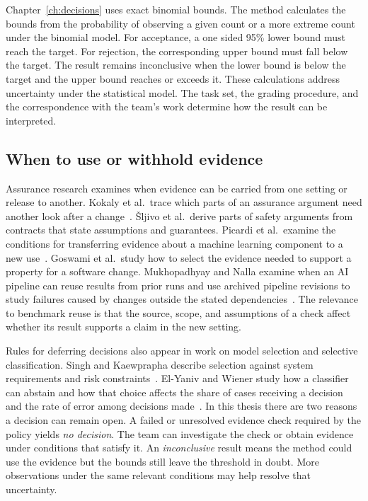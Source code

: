Chapter~\ref{ch:decisions} uses exact binomial bounds. The method calculates the bounds from the probability of observing a given count or a more extreme count under the binomial model. For acceptance, a one sided 95\% lower bound must reach the target. For rejection, the corresponding upper bound must fall below the target. The result remains inconclusive when the lower bound is below the target and the upper bound reaches or exceeds it. These calculations address uncertainty under the statistical model. The task set, the grading procedure, and the correspondence with the team's work determine how the result can be interpreted.

\subsection{When to use or withhold evidence}

Assurance research examines when evidence can be carried from one setting or release to another. Kokaly et al.\ trace which parts of an assurance argument need another look after a change~\cite{lawford_safety_case_impact_2017}. \v{S}ljivo et al.\ derive parts of safety arguments from contracts that state assumptions and guarantees. Picardi et al.\ examine the conditions for transferring evidence about a machine learning component to a new use~\cite{sljivo_assurance_contracts_2014,picardi_transfer_assurance_2023}. Goswami et al.\ study how to select the evidence needed to support a property for a software change. Mukhopadhyay and Nalla examine when an AI pipeline can reuse results from prior runs and use archived pipeline revisions to study failures caused by changes outside the stated dependencies~\cite{goswami_assurance_envelopes_2026,mukhopadhyay_nalla_evidence_reuse_2026}. The relevance to benchmark reuse is that the source, scope, and assumptions of a check affect whether its result supports a claim in the new setting.

Rules for deferring decisions also appear in work on model selection and selective classification. Singh and Kaewprapha describe selection against system requirements and risk constraints~\cite{singh_damsa_sms_2026}. El-Yaniv and Wiener study how a classifier can abstain and how that choice affects the share of cases receiving a decision and the rate of error among decisions made~\cite{el_yaniv_selective_classification_2010}. In this thesis there are two reasons a decision can remain open. A failed or unresolved evidence check required by the policy yields \emph{no decision}. The team can investigate the check or obtain evidence under conditions that satisfy it. An \emph{inconclusive} result means the method could use the evidence but the bounds still leave the threshold in doubt. More observations under the same relevant conditions may help resolve that uncertainty.

